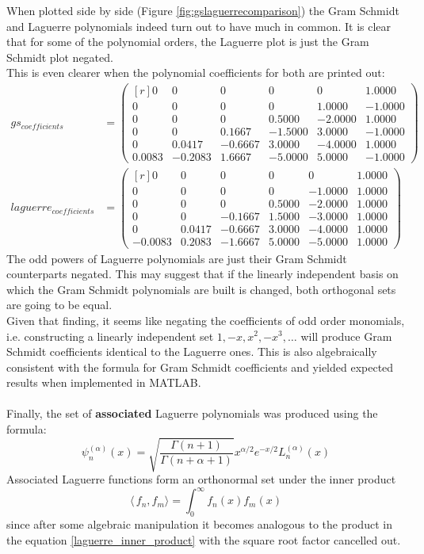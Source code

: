 \documentclass[a4paper]{article}
\numberwithin{equation}{section}
\begin{document}
When plotted side by side (Figure \ref{fig:gslaguerrecomparison}) the Gram Schmidt and Laguerre polynomials indeed turn out to have much in common. It is clear that for some of the polynomial orders, the Laguerre plot is just the Gram Schmidt plot negated. \\
This is even clearer when the polynomial coefficients for both are printed out:
\begin{align}
gs_{coefficients} &= 
\begin{pmatrix*}[r]
  0 & 0 & 0 & 0 & 0 & 1.0000 \\
  0 & 0 & 0 & 0 & 1.0000 & -1.0000 \\
  0 & 0 & 0 & 0.5000 & -2.0000 & 1.0000 \\
  0 & 0 & 0.1667 & -1.5000 & 3.0000 & -1.0000 \\
  0 & 0.0417 & -0.6667 & 3.0000 & -4.0000 & 1.0000 \\
  0.0083 & -0.2083 & 1.6667 & -5.0000 & 5.0000 & -1.0000
 \end{pmatrix*}
\\
laguerre_{coefficients} &= 
\begin{pmatrix*}[r]
  0 & 0 & 0 & 0 & 0 & 1.0000 \\
  0 & 0 & 0 & 0 & -1.0000 & 1.0000 \\
  0 & 0 & 0 & 0.5000 & -2.0000 & 1.0000 \\
  0 & 0 & -0.1667 & 1.5000 & -3.0000 & 1.0000 \\
  0 & 0.0417 & -0.6667 & 3.0000 & -4.0000 & 1.0000 \\
  -0.0083 & 0.2083 & -1.6667 & 5.0000 & -5.0000 & 1.0000
 \end{pmatrix*}
\end{align}
The odd powers of Laguerre polynomials are just their Gram Schmidt counterparts negated. This may suggest that if the linearly independent basis on which the Gram Schmidt polynomials are built is changed, both orthogonal sets are going to be equal. \\
Given that finding, it seems like negating the coefficients of odd order monomials, i.e. constructing a linearly independent set $1, -x, x^2, -x^3, \ldots$ will produce Gram Schmidt coefficients identical to the Laguerre ones. This is also algebraically consistent with the formula for Gram Schmidt coefficients and yielded expected results when implemented in MATLAB. \\
\\
Finally, the set of \textbf{associated} Laguerre polynomials was produced using the formula:
\begin{equation} \label{associated_laguerre_definition}
\psi_n^{(\alpha)}(x) = \sqrt{\frac{\Gamma(n+1)}{\Gamma(n+\alpha+1)}} x^{\alpha/2} e^{-x/2} L_n^{(\alpha)}(x)
\end{equation}
Associated Laguerre functions form an orthonormal set under the inner product \begin{equation} \label{inner_product}
\langle\,f_n, f_m \rangle = \int_{0}^{\infty}f_n(x)f_m(x)
\end{equation}
since after some algebraic manipulation it becomes analogous to the product in the equation \ref{laguerre_inner_product} with the square root factor cancelled out.
\end{document}
